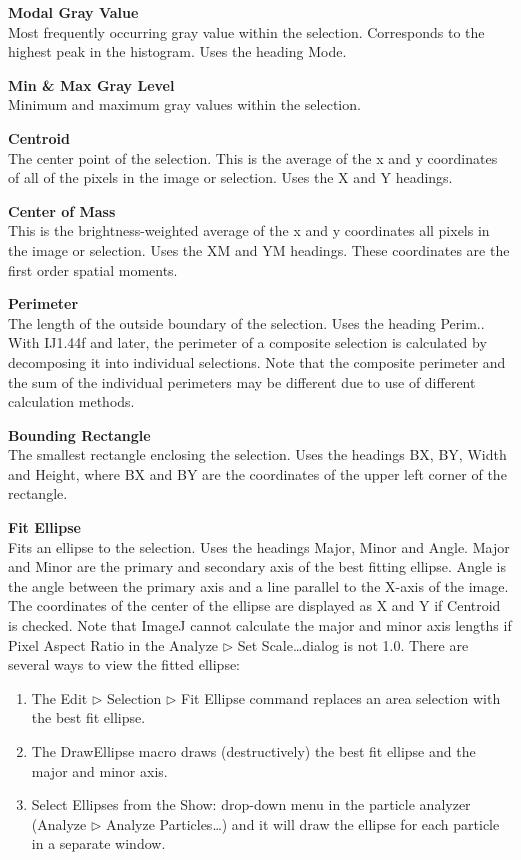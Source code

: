 \textbf{Modal Gray Value}\\Most frequently occurring gray value
within the selection. Corresponds to the highest peak in the histogram.
Uses the heading Mode.

\textbf{Min \& Max Gray Level}\\Minimum and maximum gray values
within the selection.


\textbf{Centroid}\\The center point of the selection. This is the
average of the x and y coordinates of all of the pixels in the image or
selection. Uses the X and Y headings.

\textbf{Center of Mass}\\This is the brightness-weighted average of
the x and y coordinates all pixels in the image or selection. Uses the
XM and YM headings. These coordinates are the first order spatial
moments.

\textbf{Perimeter}\\The length of the outside boundary of the
selection. Uses the heading Perim.. With IJ1.44f and
later, the perimeter of a composite selection is calculated by
decomposing it into individual selections. Note that the composite
perimeter and the sum of the individual perimeters may be different due
to use of different calculation methods.

\textbf{Bounding Rectangle}\\The smallest rectangle enclosing the
selection. Uses the headings BX, BY, Width and Height, where BX and BY
are the coordinates of the upper left corner of the rectangle.

\textbf{Fit Ellipse}\\ Fits an ellipse to the selection. Uses the
headings Major, Minor and Angle. Major and Minor are the primary and
secondary axis of the best fitting ellipse. Angle is the angle between
the primary axis and a line parallel to the X-axis of the image. The
coordinates of the center of the ellipse are displayed as X and Y if
Centroid is checked. Note that ImageJ cannot calculate the major and
minor axis lengths if Pixel Aspect Ratio in the Analyze
${\triangleright}$ Set Scale\ldots dialog is not 1.0. There are
several ways to view the fitted ellipse:
\begin{enumerate}
\item The Edit ${\triangleright}$ Selection ${\triangleright}$ Fit
Ellipse command replaces an area selection with the best fit
ellipse.

\item The DrawEllipse macro draws (destructively) the best fit ellipse and
the major and minor axis.

\item Select Ellipses from the Show: drop-down menu in the particle
analyzer (Analyze ${\triangleright}$ Analyze Particles\ldots) and it
will draw the ellipse for each particle in a separate window.
\end{enumerate}

